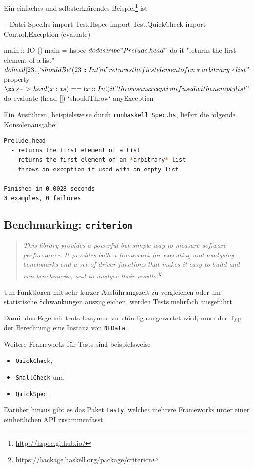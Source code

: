 Ein einfaches und selbsterklärendes
Beispiel\footnote{\url{http://hspec.github.io/}} ist
\begin{hcode}
-- Datei Spec.hs
import Test.Hspec
import Test.QuickCheck
import Control.Exception (evaluate)

main :: IO ()
main = hspec $ do
  describe "Prelude.head" $ do
    it "returns the first element of a list" $ do
      head [23 ..] `shouldBe` (23 :: Int)

    it "returns the first element of an *arbitrary* list" $
      property $ \x xs -> head (x:xs) == (x :: Int)

    it "throws an exception if used with an empty list" $ do
      evaluate (head []) `shouldThrow` anyException
\end{hcode}
Ein Ausführen, beispielsweise durch \texttt{runhaskell Spec.hs},
liefert die folgende Konsolenausgabe:
\begin{lstlisting}[language=bash 
                  ,numbers=none
                  ,backgroundcolor=\color{lightgray}]
Prelude.head
  - returns the first element of a list
  - returns the first element of an *arbitrary* list
  - throws an exception if used with an empty list

Finished in 0.0028 seconds
3 examples, 0 failures
\end{lstlisting}

\subsection{Benchmarking: \texttt{criterion}}
\begin{quote}\itshape
  This library provides a powerful but simple way to measure software
  performance. It provides both a framework for executing and analysing
  benchmarks and a set of driver functions that makes it easy to build and run
  benchmarks, and to analyse their
  results.\footnote{\url{https://hackage.haskell.org/package/criterion}}
\end{quote}
Um Funktionen mit sehr kurzer Ausführungszeit zu vergleichen oder um
statistische Schwankungen auszugleichen, werden Tests mehrfach ausgeführt.

Damit das Ergebnis trotz Lazyness vollständig ausgewertet wird, muss der Typ
der Berechnung eine Instanz von \texttt{NFData}.

Weitere Frameworks für Tests sind beispielsweise
\begin{itemize}
  \item \texttt{QuickCheck},
  \item \texttt{SmallCheck} und
  \item \texttt{QuickSpec}.
\end{itemize}
Darüber hinaus gibt es das Paket \texttt{Tasty}, welches mehrere Frameworks 
unter einer einheitlichen API zusammenfasst.

